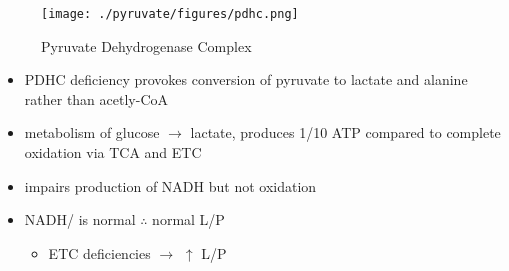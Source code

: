 \documentclass{scrartcl}
\begin{document}
\begin{figure}[htbp]
\centering
\texttt{[image: ./pyruvate/figures/pdhc.png]}
\caption[pdhc]{\label{fig:orgeab8f71}
Pyruvate Dehydrogenase Complex}
\end{figure}

\begin{itemize}
\item PDHC deficiency provokes conversion of pyruvate to lactate and alanine rather than acetly-CoA
\item metabolism of glucose \(\to\) lactate, produces 1/10 ATP compared to
complete oxidation via TCA and ETC
\item impairs production of NADH but not oxidation
\item NADH/ is normal \(\therefore\) normal L/P
\begin{itemize}
\item ETC deficiencies \(\to\) \(\uparrow\) L/P
\end{itemize}
\end{itemize}
\end{document}
